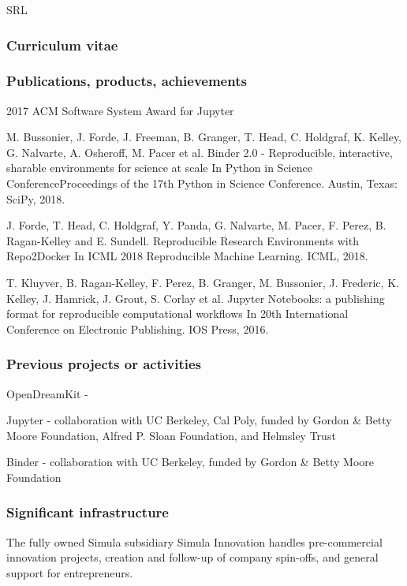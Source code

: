 \begin{sitedescription}{SRL}
\subsubsection*{Curriculum vitae}



% 
% 

\subsubsection*{Publications, products, achievements}

\begin{compactenum}
\item 2017 ACM Software System Award for Jupyter
\item M. Bussonier, J. Forde, J. Freeman, B. Granger, T. Head, C. Holdgraf, K. Kelley, G. Nalvarte, A. Osheroff, M. Pacer et al. Binder 2.0 - Reproducible, interactive, sharable environments for science at scale In Python in Science ConferenceProceedings of the 17th Python in Science Conference. Austin, Texas: SciPy, 2018.
\item J. Forde, T. Head, C. Holdgraf, Y. Panda, G. Nalvarte, M. Pacer, F. Perez, B. Ragan-Kelley and E. Sundell. Reproducible Research Environments with Repo2Docker In ICML 2018 Reproducible Machine Learning. ICML, 2018.
\item T. Kluyver, B. Ragan-Kelley, F. Perez, B. Granger, M. Bussonier, J. Frederic, K. Kelley, J. Hamrick, J. Grout, S. Corlay et al. Jupyter Notebooks: a publishing format for reproducible computational workflows In 20th International Conference on Electronic Publishing. IOS Press, 2016.

\end{compactenum}

\subsubsection*{Previous projects or activities}

\begin{compactenum}
\item OpenDreamKit -
\item Jupyter - collaboration with UC Berkeley, Cal Poly, funded by Gordon \& Betty Moore Foundation,
      Alfred P. Sloan Foundation, and Helmsley Trust
\item Binder - collaboration with UC Berkeley, funded by Gordon \& Betty Moore Foundation
\end{compactenum}

\subsubsection*{Significant infrastructure}

The fully owned Simula subsidiary Simula Innovation handles pre-commercial innovation projects, creation and follow-up of company spin-offs, and general support for entrepreneurs.

\end{sitedescription}



